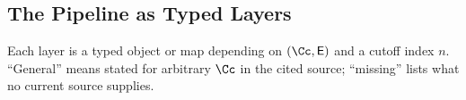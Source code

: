
\subsection{The Pipeline as Typed Layers}

Each layer is a typed object or map depending on \((\Cc,\mathsf E)\) and a
cutoff index \(n\).  ``General'' means stated for arbitrary \(\Cc\) in the
cited source; ``missing'' lists what no current source supplies.

